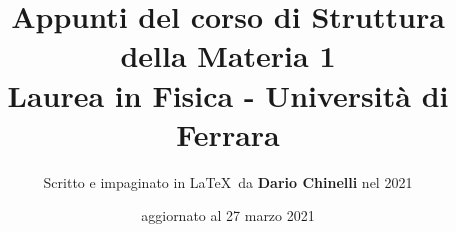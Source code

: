 \documentclass[11pt]{article}
\begin{document}
\title{\textbf{Appunti del corso di Struttura della Materia 1} \\
Laurea in Fisica - Università di Ferrara} 

\author{Scritto e impaginato in \LaTeX\ da \textbf{Dario Chinelli} nel 2021}

\date{aggiornato al 27 marzo 2021}

\maketitle

\newpage

\tableofcontents


\iffalse
    

    

    

    

    

    

    

    

    

    

    

    
\fi
    

    

    
\iffalse    
    
    
    
    
    
    
    
    
    
\fi
\end{document}
